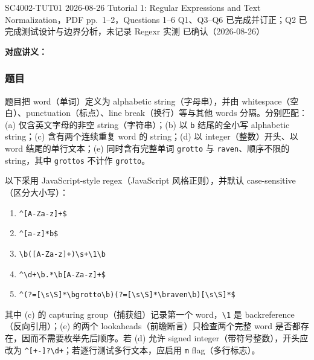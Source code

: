
\label{tutorial:SC4002-TUT01}

\tutorialmeta
  {SC4002-TUT01}
  {2026-08-26}
  {Tutorial 1: Regular Expressions and Text Normalization，PDF pp.~1--2，Questions 1--6}
  {Q1、Q3--Q6 已完成并订正；Q2 已完成测试设计与边界分析，未记录 Regexr 实测}
  {已确认（2026-08-26）}


\textbf{对应讲义：}

\subsubsection*{题目}

题目把 word（单词）定义为 alphabetic string（字母串），并由 whitespace（空白）、punctuation（标点）、line break（换行）等与其他 words 分隔。分别匹配：(a) 仅含英文字母的非空 string（字符串）；(b) 以 \texttt{b} 结尾的全小写 alphabetic string；(c) 含有两个连续重复 word 的 string；(d) 以 integer（整数）开头、以 word 结尾的单行文本；(e) 同时含有完整单词 \texttt{grotto} 与 \texttt{raven}、顺序不限的 string，其中 \texttt{grottos} 不计作 \texttt{grotto}。

\begin{checkedsolution}
以下采用 JavaScript-style regex（JavaScript 风格正则），并默认 case-sensitive（区分大小写）：
\begin{enumerate}[label=(\alph*)]
  \item \verb|^[A-Za-z]+$|
  \item \verb|^[a-z]*b$|
  \item \verb|\b([A-Za-z]+)\s+\1\b|
  \item \verb|^\d+\b.*\b[A-Za-z]+$|
  \item \verb|^(?=[\s\S]*\bgrotto\b)(?=[\s\S]*\braven\b)[\s\S]*$|
\end{enumerate}

其中 (c) 的 capturing group（捕获组）记录第一个 word，\verb|\1| 是 backreference（反向引用）；(e) 的两个 lookaheads（前瞻断言）只检查两个完整 word 是否都存在，因而不需要枚举先后顺序。若 (d) 允许 signed integer（带符号整数），开头应改为 \verb|^[+-]?\d+|；若逐行测试多行文本，应启用 \texttt{m} flag（多行标志）。
\end{checkedsolution}

